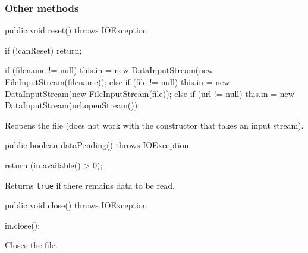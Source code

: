 \subsubsection*{Other methods}

\begin{code}
   public void reset() throws IOException \begin{hide} {
      if (!canReset)
         return;

      if (filename != null)
         this.in = new DataInputStream(new FileInputStream(filename));
      else if (file != null)
         this.in = new DataInputStream(new FileInputStream(file));
      else if (url != null)
         this.in = new DataInputStream(url.openStream());
   }
   \end{hide}
\end{code}
\begin{tabb}
Reopens the file (does not work with the constructor that takes an input stream).
\end{tabb}
\begin{code}

   public boolean dataPending() throws IOException \begin{hide} {
      return (in.available() > 0);
   }
   \end{hide}
\end{code}
\begin{tabb}
Returns \texttt{true} if there remains data to be read.
\end{tabb}
\begin{code}

   public void close() throws IOException \begin{hide} {
      in.close();
   }
   \end{hide}
\end{code}
\begin{tabb}
Closes the file.
\end{tabb}

\begin{code}\begin{hide}
}
\end{hide}\end{code}
